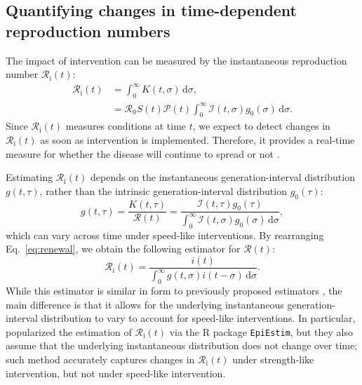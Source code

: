 \documentclass[12pt]{article}
\newcommand{\eref}[1]{Eq.~\ref{eq:#1}}
\newcommand{\Rx}[1]{\ensuremath{{\mathcal R}_{#1}}\xspace}
\newcommand{\Ri}{\Rx{\mathrm{i}}}
\newcommand{\RR}{\ensuremath{{\mathcal R}}\xspace}
\newcommand{\dd}[1]{\ensuremath{\, \mathrm{d}#1}}
\newcommand{\dsigma}{\dd{\sigma}}
\newcommand{\PP}{{\mathcal P}}
\newcommand{\II}{\ensuremath{\mathcal I}}
\begin{document}
\subsection{Quantifying changes in time-dependent reproduction numbers}

The impact of intervention can be measured by the instantaneous reproduction number $\Ri(t)$:
\begin{align}
\Ri(t) &= \int_0^\infty K(t, \sigma) \dsigma, \\
&= \RR_0 S(t) \PP(t) \int_0^\infty \II(t,\sigma) g_0(\sigma) \dsigma.
\label{eq:rt}
\end{align}
Since $\Ri(t)$ measures conditions at time $t$, we expect to detect changes in $\Ri(t)$ as soon as intervention is implemented.
Therefore, it provides a real-time measure for whether the disease will continue to spread or not \citep{gostic2020practical}.

Estimating $\Ri(t)$ depends on the instantaneous generation-interval distribution $g(t, \tau)$, rather than the intrinsic generation-interval distribution $g_0(\tau)$:
\begin{equation}
g(t, \tau) = \frac{K(t, \tau)}{\RR(t)} = \frac{\II(t,\tau) g_0(\tau)}{\int_0^\infty \II(t,\sigma) g_0(\sigma) \dsigma},
\end{equation}
which can vary across time under speed-like interventions.
By rearranging \eref{renewal}, we obtain the following estimator for $\RR(t)$:
\begin{equation}
\Ri(t) = \frac{i(t)}{\int_0^\infty g(t, \sigma) i(t-\sigma) \dsigma}.
\end{equation}
While this estimator is similar in form to previously proposed estimators \citep{fraser2007estimating}, the main difference is that it allows for the underlying instantaneous generation-interval distribution to vary to account for speed-like interventions.
In particular, \cite{cori2013new} popularized the estimation of $\Ri(t)$ via the R package \texttt{EpiEstim}, but they also assume that the underlying instantaneous distribution does not change over time; 
such method accurately captures changes in $\Ri(t)$ under strength-like intervention, but not under speed-like intervention.
\end{document}
